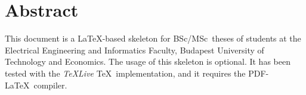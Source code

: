 \vfill
\selectenglish


\chapter*{Abstract}

This document is a \LaTeX-based skeleton for BSc/MSc~theses of students at the Electrical Engineering and Informatics Faculty, Budapest University of Technology and Economics. The usage of this skeleton is optional. It has been tested with the \emph{TeXLive} \TeX~implementation, and it requires the PDF-\LaTeX~compiler.


\vfill
\selectthesislanguage

\setcounter{romanPage}{\value{page}}

